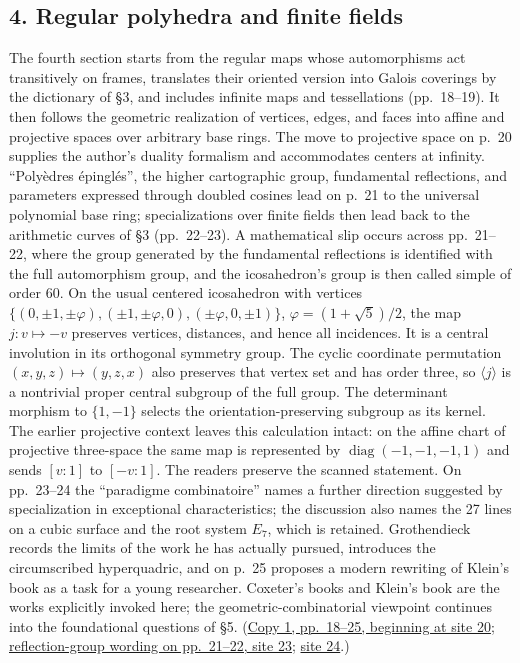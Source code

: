 \subsection*{4. Regular polyhedra and finite fields}
The fourth section starts from the regular maps whose automorphisms act
transitively on frames, translates their oriented version into Galois
coverings by the dictionary of \S3, and includes infinite maps and
tessellations (pp.~18--19). It then follows the geometric realization of
vertices, edges, and faces into affine and projective spaces over arbitrary
base rings. The move to projective space on p.~20 supplies the author's
duality formalism and accommodates centers at infinity. ``Polyèdres
épinglés'', the higher cartographic group, fundamental reflections, and
parameters expressed through doubled cosines lead on p.~21 to the
universal polynomial base ring; specializations over finite fields then
lead back to the arithmetic curves of \S3 (pp.~22--23). A mathematical
slip occurs across pp.~21--22, where the group generated by the fundamental
reflections is identified with the full automorphism group, and the
icosahedron's group is then called simple of order 60. On the usual
centered icosahedron with vertices
$\{(0,\pm1,\pm\varphi),(\pm1,\pm\varphi,0),(\pm\varphi,0,\pm1)\}$,
$\varphi=(1+\sqrt5)/2$, the map $j:v\mapsto-v$ preserves vertices,
distances, and hence all incidences. It is a central involution in its
orthogonal symmetry group. The cyclic coordinate permutation
$(x,y,z)\mapsto(y,z,x)$ also preserves that vertex set and has order three,
so $\langle j\rangle$ is a nontrivial proper central subgroup of the full
group. The determinant morphism to $\{1,-1\}$ selects the
orientation-preserving subgroup as its kernel. The earlier projective
context leaves this calculation intact: on the affine chart of projective
three-space the same map is represented by
$\operatorname{diag}(-1,-1,-1,1)$ and sends $[v:1]$ to $[-v:1]$.
The readers preserve the scanned statement. On pp.~23--24 the
``paradigme combinatoire'' names a further direction suggested by
specialization in exceptional characteristics; the discussion also names
the 27 lines on a cubic surface and the root system $E_7$, which is
retained. Grothendieck records the limits of the work he has actually
pursued, introduces the circumscribed hyperquadric, and on p.~25 proposes
a modern rewriting of Klein's book as a task for a young researcher.
Coxeter's books and Klein's book are the works explicitly invoked here;
the geometric-combinatorial viewpoint continues into the foundational
questions of \S5.
(\href{https://grothendieck.umontpellier.fr/web/viewer.html?file=../119.pdf\#page=21}{Copy 1, pp.~18--25, beginning at site 20};
\href{https://grothendieck.umontpellier.fr/web/viewer.html?file=../119.pdf\#page=24}{reflection-group wording on pp.~21--22, site 23};
\href{https://grothendieck.umontpellier.fr/web/viewer.html?file=../119.pdf\#page=25}{site 24}.)

